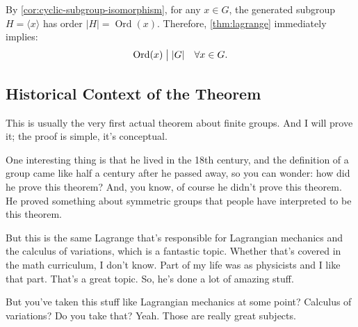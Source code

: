 \begin{content}



\begin{steps}
By \cref{cor:cyclic-subgroup-isomorphism}, for any $x \in G$, the generated subgroup $H = \langle x \rangle$ has order $|H| = \operatorname{Ord}(x)$. Therefore, \cref{thm:lagrange} immediately implies:
\[
\operatorname{Ord}(x) \bigm| |G| \quad \forall x \in G.
\]
\end{steps}
\end{content}

\subsection{Historical Context of the Theorem}

\begin{speech}[00:10:50 - 00:12:05]
This is usually the very first actual theorem about finite groups. And I will prove it; the proof is simple, it's conceptual.

One interesting thing is that he lived in the 18th century, and the definition of a group came like half a century after he passed away, so you can wonder: how did he prove this theorem? And, you know, of course he didn't prove this theorem. He proved something about symmetric groups that people have interpreted to be this theorem.

But this is the same Lagrange that's responsible for Lagrangian mechanics and the calculus of variations, which is a fantastic topic. Whether that's covered in the math curriculum, I don't know. Part of my life was as physicists and I like that part. That's a great topic. So, he's done a lot of amazing stuff.

But you've taken this stuff like Lagrangian mechanics at some point? Calculus of variations? Do you take that? Yeah. Those are really great subjects.
\end{speech}

